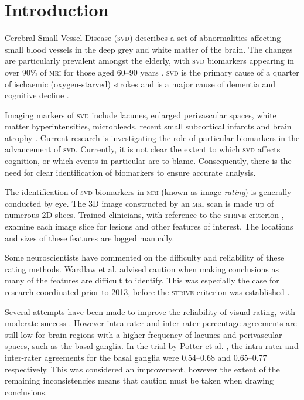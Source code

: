 


\chapter{Introduction}\label{s-intro}

{\noindent} Cerebral Small Vessel Disease (\textsc{svd}) describes a set of abnormalities affecting small blood vessels in the deep grey and white matter of the brain. The changes are particularly prevalent amongst the elderly, with \textsc{svd} biomarkers appearing in over 90\% of \textsc{mri} for those aged 60--90 years \cite{deLeeuwF-E2001Pocw}. \textsc{svd} is the primary cause of a quarter of ischaemic (oxygen-starved) strokes \cite{WardlawJ.M.2013Nsfr} and is a major cause of dementia and cognitive decline \cite{NorrvingBo2008Linb}.

Imaging markers of \textsc{svd} include lacunes, enlarged perivascular spaces, white matter hyperintensities, microbleeds, recent small subcortical infarcts and brain atrophy \cite{WardlawJ.M.2013Nsfr}. Current research is investigating the role of particular biomarkers in the advancement of \textsc{svd}. Currently, it is not clear the extent to which \textsc{svd} affects cognition, or which events in particular are to blame. Consequently, there is the need for clear identification of biomarkers to ensure accurate analysis.

The identification of \textsc{svd} biomarkers in \textsc{mri} (known as image \textit{rating}) is generally conducted by eye. The 3D image constructed by an \textsc{mri} scan is made up of numerous 2D slices. Trained clinicians, with reference to the \textsc{strive} criterion \cite{WardlawJ.M.2013Nsfr}, examine each image slice for lesions and other features of interest. The locations and sizes of these features are logged manually.

Some neuroscientists have commented on the difficulty and reliability of these rating methods. Wardlaw et al. \cite{WardlawJm2013Mosc} advised caution when making conclusions as many of the features are difficult to identify. This was especially the case for research coordinated prior to 2013, before the \textsc{strive} criterion was established \cite{WardlawJ.M.2013Nsfr}.

Several attempts have been made to improve the reliability of visual rating, with moderate success \cite{AdamsH.H.Hieab2013RMfD, PotterGillian2015CPSV}. However intra-rater and inter-rater percentage agreements are still low for brain regions with a higher frequency of lacunes and perivascular spaces, such as the basal ganglia. In the trial by Potter et al. \cite{PotterGillian2015CPSV},  the intra-rater and inter-rater agreements for the basal ganglia were 0.54--0.68 and 0.65--0.77 respectively. This was considered an improvement, however the extent of the remaining inconsistencies means that caution must be taken when drawing conclusions.

